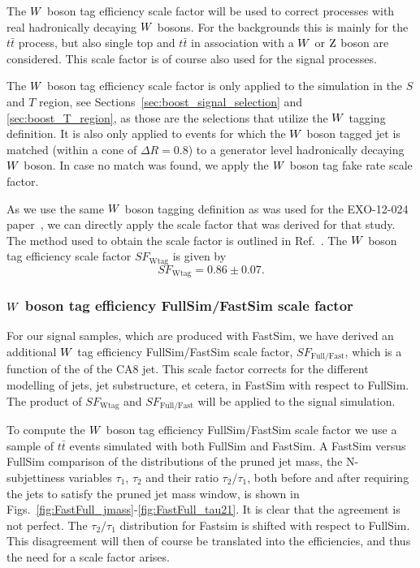 The $W$ boson tag efficiency scale factor will be used to correct processes with real
hadronically decaying $W$ bosons. For the backgrounds this is mainly for the $t\bar{t}$ process,
but also single top and $t\bar{t}$ in association with a $W$ or $\mathrm{Z}$ boson are considered. This
scale factor is of course also used for the signal processes. 

The $W$ boson tag efficiency scale factor is only applied to the simulation in the $S$ and $T$
region, see Sections~\ref{sec:boost_signal_selection} and \ref{sec:boost_T_region}, as those are the
selections that utilize the $W$ tagging definition. It is also only applied to events for which
the $W$ boson tagged jet is matched (within a cone of $\Delta R = 0.8$) to a generator level
hadronically decaying $W$ boson. In case no match was found, we apply the $W$ boson tag fake rate
scale factor. 

As we use the same $W$ boson tagging definition as was used for the EXO-12-024
paper~\cite{EXO-12-024}, we can directly apply the scale factor that was derived for that study. The
method used to obtain the scale factor is outlined in Ref.~\cite{CMS-PAS-JME-13-006}. 
The $W$ boson tag efficiency scale factor $SF_{\textrm{Wtag}}$ is given by
\begin{equation}
SF_{\textrm{Wtag}} = 0.86 \pm 0.07 .
\end{equation}


\subsubsection{\texorpdfstring{$W$}{W} boson tag efficiency FullSim/FastSim scale factor
\label{sec:wtag_eff_fastfull_sf}}

For our signal samples, which are produced with FastSim, we have derived an additional $W$ tag
efficiency FullSim/FastSim scale factor, $SF_{\textrm{Full/Fast}}$, which is a function of the \pt
of the CA8 jet. This scale factor corrects for the different modelling of jets, jet
substructure, et cetera, in FastSim with respect to FullSim. The product of $SF_{\textrm{Wtag}}$ and
$SF_{\textrm{Full/Fast}}$ will be applied to the signal simulation. 

To compute the $W$ boson tag efficiency FullSim/FastSim scale factor we use a sample of $t\bar{t}$
events simulated with both FullSim and FastSim. 
A FastSim versus FullSim comparison of the distributions of the pruned jet mass, the N-subjettiness
variables $\tau_1$, $\tau_2$ and their ratio $\tau_2/\tau_1$, both before and after requiring the
jets to satisfy the pruned jet mass window, is shown in
Figs.~\ref{fig:FastFull_jmass}-\ref{fig:FastFull_tau21}. It is clear that the agreement is not
perfect. The $\tau_2/\tau_1$ distribution for Fastsim is shifted with respect to FullSim. This
disagreement will then of course be translated into the efficiencies, and thus the need for a scale
factor arises. 

